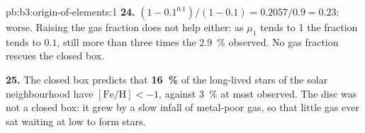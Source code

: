 \begin{solution}{pb:b3:origin-of-elements:1}
\textbf{24.} $(1 - 0.1^{0.1})/(1 - 0.1) = 0.2057/0.9 = \num{0.23}$: worse.
Raising the gas fraction does not help either: as $\mu_1$ tends to 1
the fraction tends to $0.1$, still more than three times the
\qty{2.9}{\percent} observed. No gas fraction rescues the closed box.

\textbf{25.} The closed box predicts that
\textbf{\qty[text-series-to-math=true]{16}{\percent}} of the long-lived
stars of the solar neighbourhood have $[\mathrm{Fe/H}] < -1$, against
\qty{3}{\percent} at most observed. The disc was not a closed box: it
grew by a slow infall of metal-poor gas, so that little gas ever sat
waiting at low  to form stars.
\end{solution}
